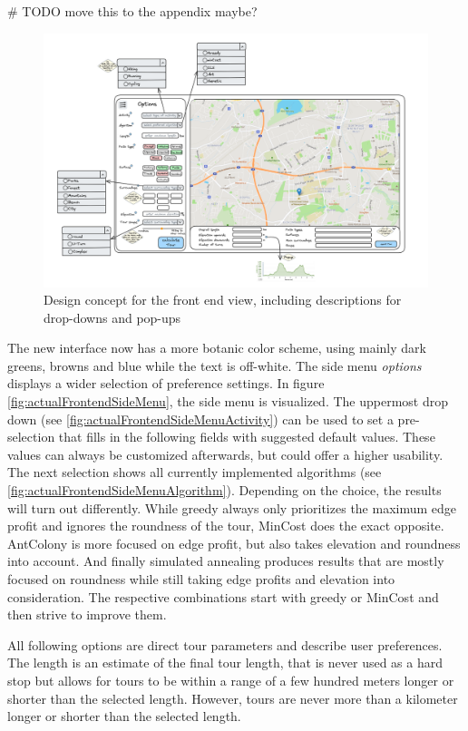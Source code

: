 \# TODO move this to the appendix maybe?
\begin{figure}[H]
	\includegraphics[width=0.9\linewidth]{bilder/Concept new Frontend design.png}
	\caption{Design concept for the front end view, including descriptions for drop-downs and pop-ups}
	\label{fig:frontendConcept}
\end{figure}



The new interface now has a more botanic color scheme, using mainly dark greens, browns and blue while the text is off-white.
The side menu \textit{options} displays a wider selection of preference settings.
In figure \ref{fig:actualFrontendSideMenu}, the side menu is visualized. 
The uppermost drop down (see \ref{fig:actualFrontendSideMenuActivity}) can be used to set a pre-selection that fills in the following fields with suggested default values. 
These values can always be customized afterwards, but could offer a higher usability.
The next selection shows all currently implemented algorithms (see \ref{fig:actualFrontendSideMenuAlgorithm}).
Depending on the choice, the results will turn out differently.
While greedy always only prioritizes the maximum edge profit and ignores the roundness of the tour, MinCost does the exact opposite.
AntColony is more focused on edge profit, but also takes elevation and roundness into account.
And finally simulated annealing produces results that are mostly focused on roundness while still taking edge profits and elevation into consideration. 
The respective combinations start with greedy or MinCost and then strive to improve them. 

All following options are direct tour parameters and describe user preferences.
The length is an estimate of the final tour length, that is never used as a hard stop but allows for tours to be within a range of a few hundred meters longer or shorter than the selected length.
However, tours are never more than a kilometer longer or shorter than the selected length.



